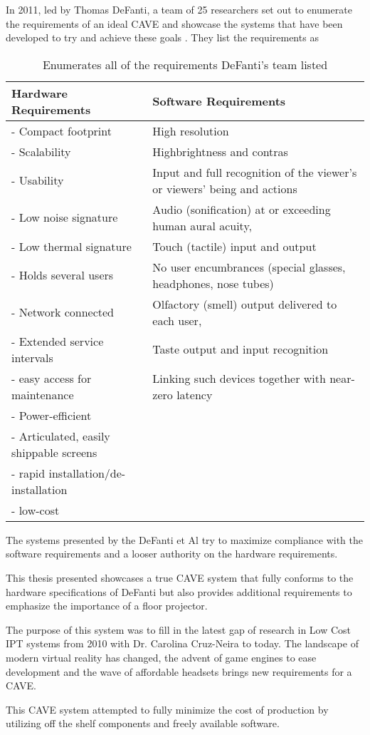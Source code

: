 \label{chapter:discussionChapter}



In 2011, led by Thomas DeFanti, a team of 25 researchers set out to enumerate the requirements of an ideal CAVE and showcase the systems that have been developed to try and achieve these goals 
\noindent\cite{defanti-future-cave}. They list the  requirements as 


\begin{table}[H]
	\centering
	\renewcommand\arraystretch{0.5}
	\begin{tabular}{l | l}
		Hardware Requirements &  Software Requirements\\ 
		\hline
		- Compact footprint &  High resolution \\ 
		- Scalability &  Highbrightness and contras\\ 
		- Usability &  Input and full recognition of the viewer’s or viewers’ being and actions \\ 
		- Low noise signature & Audio (sonification) at or exceeding human aural acuity,   \\ 
		- Low thermal signature &  Touch (tactile) input and output\\ 
		- Holds several users  & No user encumbrances (special glasses, headphones, nose tubes)\\ 
		- Network connected & Olfactory (smell) output delivered to each user, \\ 
		- Extended service intervals &  Taste output and input recognition \\
		- easy access for maintenance &  Linking such devices together with near-zero latency\\ 
		- Power-efficient &  \\ 
		- Articulated, easily shippable screens &  \\ 
		- rapid installation/de-installation &   \\ 	
		- low-cost  &   \\ 
	\end{tabular} 
	
	\label{tbl:defantirequirements}
	\caption{Enumerates all of the requirements DeFanti's team listed}
\end{table}

The systems presented by the DeFanti et Al try to maximize compliance with the software requirements and a looser authority on the hardware requirements. 

This thesis presented showcases a true CAVE system that fully conforms to the hardware specifications of DeFanti \cite{defanti-future-cave} but also provides additional requirements to emphasize the importance of a floor projector. 

The purpose of this system was to fill in the latest gap of research in Low Cost IPT systems  from 2010 with Dr. Carolina Cruz-Neira to today. The landscape of modern virtual reality has changed, the advent of game engines to ease development and the wave of affordable headsets brings new requirements for a CAVE.

This CAVE system attempted to fully minimize the cost of production by utilizing off the shelf components and freely available software. 


\clearpage
